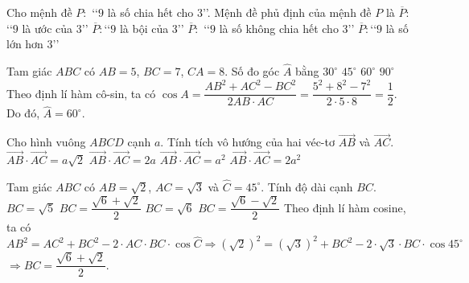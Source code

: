 \begin{ex}%
Cho mệnh đề $P\colon$ \lq\lq  $9$ là số chia hết cho $3$\rq\rq. Mệnh đề phủ định của mệnh đề $P$ là
\choice
{$\overline{P}\colon$\lq\lq  $9$ là ước của $3$\rq\rq}
{$\overline{P}\colon$\lq\lq  $9$ là bội của $3$\rq\rq}
{\True $\overline{P}\colon$ \lq\lq  $9$ là số không chia hết cho $3$\rq\rq}
{$\overline{P}\colon$\lq\lq  $9$ là số lớn hơn $3$\rq\rq}
\end{ex}

\begin{ex}%
Tam giác $ ABC$ có $ AB=5$, $BC=7$, $CA=8$. Số đo góc $ \widehat{A}$ bằng
\choice
{$ 30^\circ $}
{$ 45^\circ $}
{\True $ 60^\circ $}
{$ 90^\circ $}
\loigiai
{Theo định lí hàm cô-sin, ta có $ \cos{A}=\dfrac{AB^2+AC^2-BC^2}{2AB\cdot AC}=\dfrac{5^2+8^2-7^2}{2\cdot 5\cdot 8}=\dfrac{1}{2}$.\\
Do đó, $ \widehat{A}=60^\circ $.}
\end{ex}

\begin{ex}%
Cho hình vuông $ABCD$ cạnh $a$. Tính tích vô hướng của hai véc-tơ $\overrightarrow{AB}$ và $\overrightarrow{AC}$.
\choice
{$\overrightarrow{AB}\cdot\overrightarrow{AC}=a\sqrt{2}$}
{$\overrightarrow{AB}\cdot\overrightarrow{AC}=2a$}
{\True $\overrightarrow{AB}\cdot\overrightarrow{AC}=a^2$}
{$\overrightarrow{AB}\cdot\overrightarrow{AC}=2a^2$}
\end{ex}

\begin{ex}%
Tam giác $ ABC$ có $ AB=\sqrt{2}$, $AC=\sqrt{3}$ và $ \widehat{C}=45^\circ $. Tính độ dài cạnh $ BC$.
\choice
{$ BC=\sqrt{5}$}
{\True $ BC=\dfrac{\sqrt{6}+\sqrt{2}}{2}$}
{$ BC=\sqrt{6}$}
{$ BC=\dfrac{\sqrt{6}-\sqrt{2}}{2}$}
\loigiai
{Theo định lí hàm cosine, ta có\\
$ AB^2=AC^2+BC^2-2\cdot AC\cdot BC\cdot \cos \widehat{C}\Rightarrow {(\sqrt{2} )}^2={(\sqrt{3} )}^2+BC^2-2\cdot \sqrt{3}\cdot BC\cdot \cos 45^\circ $ \\
$ \Rightarrow BC=\dfrac{\sqrt{6}+\sqrt{2}}{2}$.}
\end{ex}

